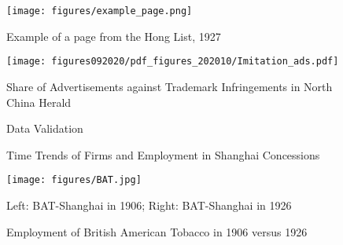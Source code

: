 \documentclass[12pt]{article}
\begin{document}
\begin{figure}[ht]
    \centering
    \texttt{[image: figures/example\_page.png]}
    \caption{Example of a page from the Hong List, 1927}
    \label{fig:examplepage}            
\end{figure}

\begin{figure}[ht]
    \centering
    \texttt{[image: figures092020/pdf\_figures\_202010/Imitation\_ads.pdf]}  
    \caption{Share of Advertisements against Trademark Infringements in North China Herald}
    \label{fig:imitation}
\end{figure}

\begin{figure}[ht]
    \centering
    \quad
    \caption{Data Validation}
    \label{fig:validation}
\end{figure}

\vspace{1.5cm}

\begin{figure}[ht]
    \centering
    \quad  
    \caption{Time Trends of Firms and Employment in Shanghai Concessions}
    \label{fig:yeartrend}
\end{figure}

\vspace{1.5cm}

\begin{figure}[ht]
    \centering
    \texttt{[image: figures/BAT.jpg]}
    \par
    \centering \footnotesize{Left: BAT-Shanghai in 1906; Right: BAT-Shanghai in 1926}
    \caption{Employment of British American Tobacco in 1906 versus 1926}
    \label{fig:BAT}
\end{figure}

\vspace{1.5cm}
\end{document}

